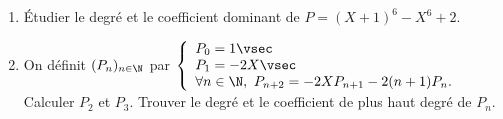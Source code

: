 \documentclass[a4paper, 11pt,reqno]{article}
\begin{document}
\setlength\fboxrule{0.5pt}

{\footnotesize \begin{exercice}
		\begin{enumerate}
			\item \'Etudier le degr\'e et le coefficient dominant de $P=(X+1)^6-X^6+2$.
			\item On d\'efinit $(P_n)_{n\in\N}$ par $\left\lbrace\begin{array}{l}
					      P_0=1\vsec   \\
					      P_1=-2X\vsec \\
					      \forall n\in\N,\ P_{n+2}=-2XP_{n+1}-2(n+1)P_n.
				      \end{array}\right.$ \\
			      Calculer $P_2$ et $P_3$. Trouver le degr\'e et le coefficient de plus haut degr\'e de $P_n$.

\end{enumerate}
\end{exercice}}
\end{document}
